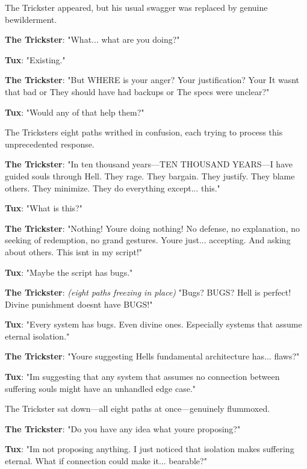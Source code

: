 The Trickster appeared, but his usual swagger was replaced by genuine bewilderment.

\textbf{The Trickster}: "What... what are you doing?"

\textbf{Tux}: "Existing."

\textbf{The Trickster}: "But WHERE is your anger? Your justification? Your \textquotesingle It wasn\textquotesingle t that bad\textquotesingle{} or \textquotesingle They should have had backups\textquotesingle{} or \textquotesingle The specs were unclear\textquotesingle?"

\textbf{Tux}: "Would any of that help them?"

The Trickster\textquotesingle s eight paths writhed in confusion, each trying to process this unprecedented response.

\textbf{The Trickster}: "In ten thousand years---TEN THOUSAND YEARS---I have guided souls through Hell. They rage. They bargain. They justify. They blame others. They minimize. They do everything except... this."

\textbf{Tux}: "What is \textquotesingle this\textquotesingle?"

\textbf{The Trickster}: "Nothing! You\textquotesingle re doing nothing! No defense, no explanation, no seeking of redemption, no grand gestures. You\textquotesingle re just... accepting. And asking about others. This isn\textquotesingle t in my script!"

\textbf{Tux}: "Maybe the script has bugs."

\textbf{The Trickster}: \emph{(eight paths freezing in place)} "Bugs? BUGS? Hell is perfect! Divine punishment doesn\textquotesingle t have BUGS!"

\textbf{Tux}: "Every system has bugs. Even divine ones. Especially systems that assume eternal isolation."

\textbf{The Trickster}: "You\textquotesingle re suggesting Hell\textquotesingle s fundamental architecture has... flaws?"

\textbf{Tux}: "I\textquotesingle m suggesting that any system that assumes no connection between suffering souls might have an unhandled edge case."

The Trickster sat down---all eight paths at once---genuinely flummoxed.

\textbf{The Trickster}: "Do you have any idea what you\textquotesingle re proposing?"

\textbf{Tux}: "I\textquotesingle m not proposing anything. I just noticed that isolation makes suffering eternal. What if connection could make it... bearable?"

